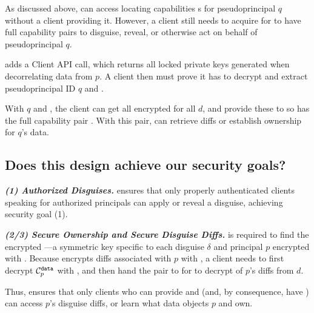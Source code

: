 As discussed above, \sys can access locating capabilities s for pseudoprincipal $q$ without a
client providing it. 
%
However, a client still needs to acquire  for \sys to have full capability pairs
to disguise, reveal, or otherwise act on behalf of pseudoprincipal $q$.

\sys adds a  Client API call, which returns all locked private
keys  generated when decorrelating data from $p$.
A client then must prove it has  to decrypt  and extract pseudoprincipal ID $q$ and .

With $q$ and , the client can get all encrypted  for all $d$, and
provide these to \sys so \sys has the full capability pair . With
this pair, \sys can retrieve diffs or establish ownership for $q$'s data.


\subsection{Does this design achieve our security goals?}
\label{sec:achievegoals}
\vspace{6pt}\noindent\textbf{\emph{(1) Authorized Disguises.}}
\sys ensures that only properly authenticated clients speaking for authorized principals can apply or
reveal a disguise, achieving security goal (1).

\vspace{6pt}\noindent\textbf{\emph{(2/3) Secure Ownership and Secure Disguise Diffs.}}
 is required to find the encrypted ---a symmetric key
specific to each disguise $\delta$ and principal $p$ encrypted with .
Because \sys encrypts  diffs associated with $p$ with , a client
needs to first decrypt $\mathcal{C}^{\texttt{data}}_{p}$ with , and then hand the pair 
to \sys for \sys to decrypt of $p$'s diffs from $d$.

Thus, \sys ensures that only clients who can provide  and  (and,
by consequence, have ) can access $p$'s disguise diffs, or learn what data objects $p$ and
own. 

